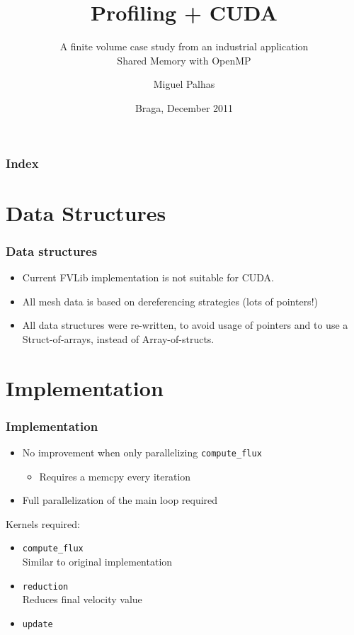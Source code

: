 \documentclass{beamer}
\title{Profiling + CUDA}
\subtitle{A finite volume case study from an industrial application\\\smaller Shared Memory with OpenMP}
\author{Miguel Palhas}
\institute[pg19808]{
	University of Minho \\
	Department of Informatics
}
\date{Braga, December 2011}
\begin{document}

\maketitle%

\begin{frame}
	\frametitle{Index}
	\tableofcontents
\end{frame}

\section{Data Structures}
\begin{frame}
	\frametitle{Data structures}

	\begin{itemize}
	\item[] Current FVLib implementation is not suitable for CUDA.
	\item[] All mesh data is based on dereferencing strategies (lots of pointers!)
	\item[] All data structures were re-written, to avoid usage of pointers and to use a Struct-of-arrays, instead of Array-of-structs.
	\end{itemize}
\end{frame}

\section{Implementation}
\begin{frame}
	\frametitle{Implementation}

	\begin{itemize}
		\item[] No improvement when only parallelizing \texttt{compute\_flux}
		\begin{itemize}
			\item[] Requires a memcpy every iteration
		\end{itemize}
		\item[] Full parallelization of the main loop required
	\end{itemize}

	Kernels required:
	\begin{itemize}
		\item \texttt{compute\_flux} \\
			Similar to original implementation
		\item \texttt{reduction} \\
			Reduces final velocity value
		\item \texttt{update}
	\end{itemize}
\end{frame}
\end{document}
